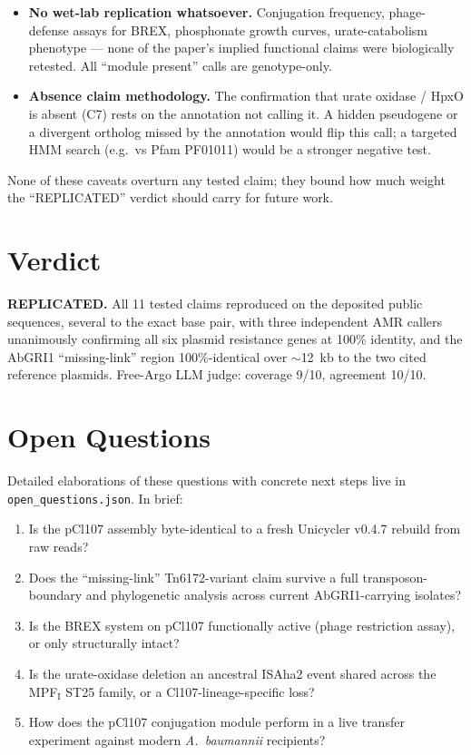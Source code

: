 \documentclass[11pt]{article}
\begin{document}
\begin{itemize}
  \item \textbf{No wet-lab replication whatsoever.} Conjugation frequency, phage-defense assays for BREX, phosphonate growth curves, urate-catabolism phenotype --- none of the paper's implied functional claims were biologically retested. All ``module present'' calls are genotype-only.
  \item \textbf{Absence claim methodology.} The confirmation that urate oxidase / HpxO is absent (C7) rests on the annotation not calling it. A hidden pseudogene or a divergent ortholog missed by the annotation would flip this call; a targeted HMM search (e.g.\ vs Pfam PF01011) would be a stronger negative test.
\end{itemize}

None of these caveats overturn any tested claim; they bound how much weight the ``REPLICATED'' verdict should carry for future work.

\section{Verdict}
\textbf{REPLICATED.} All 11 tested claims reproduced on the deposited public sequences, several to the exact base pair, with three independent AMR callers unanimously confirming all six plasmid resistance genes at 100\% identity, and the AbGRI1 ``missing-link'' region 100\%-identical over $\sim$12~kb to the two cited reference plasmids. Free-Argo LLM judge: coverage 9/10, agreement 10/10.

\section{Open Questions}
Detailed elaborations of these questions with concrete next steps live in \texttt{open\_questions.json}. In brief:
\begin{enumerate}
  \item Is the pCl107 assembly byte-identical to a fresh Unicycler v0.4.7 rebuild from raw reads?
  \item Does the ``missing-link'' Tn6172-variant claim survive a full transposon-boundary and phylogenetic analysis across current AbGRI1-carrying isolates?
  \item Is the BREX system on pCl107 functionally active (phage restriction assay), or only structurally intact?
  \item Is the urate-oxidase deletion an ancestral ISAha2 event shared across the MPF$_\mathrm{I}$ ST25 family, or a Cl107-lineage-specific loss?
  \item How does the pCl107 conjugation module perform in a live transfer experiment against modern \textit{A.~baumannii} recipients?
\end{enumerate}
\end{document}
